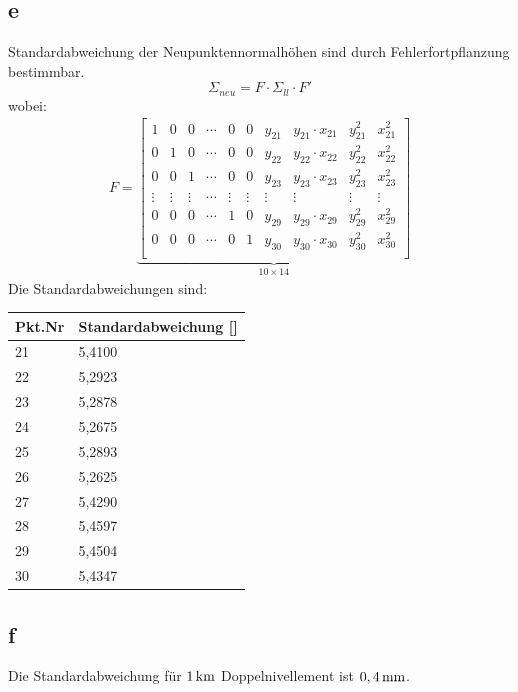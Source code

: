 \subsection{e}
Standardabweichung der Neupunktennormalhöhen sind durch Fehlerfortpflanzung bestimmbar. 
\begin{equation*}
	\Sigma_{neu} = F \cdot \Sigma_{ll} \cdot F'
\end{equation*} 
wobei:
\begin{gather*}
	F = \underbrace{\begin{bmatrix}
	1 & 0 & 0 & \cdots & 0 & 0 & y_{21} & y_{21} \cdot x_{21} & y_{21}^2 & x_{21}^2 \\
	0 & 1 & 0 & \cdots & 0 & 0 & y_{22} & y_{22} \cdot x_{22} & y_{22}^2 & x_{22}^2 \\
	0 & 0 & 1 & \cdots & 0 & 0 & y_{23} & y_{23} \cdot x_{23} & y_{23}^2 & x_{23}^2 \\
	\vdots & \vdots & \vdots & \cdots & \vdots & \vdots & \vdots & \vdots & \vdots & \vdots \\
	0 & 0 & 0 & \cdots & 1 & 0 & y_{29} & y_{29} \cdot x_{29} & y_{29}^2 & x_{29}^2 \\
	0 & 0 & 0 & \cdots & 0 & 1 & y_{30} & y_{30} \cdot x_{30} & y_{30}^2 & x_{30}^2 \\
	\end{bmatrix}}_{\text{$10 \times 14$}}
\end{gather*}
Die Standardabweichungen sind: 
\begin{table}[ht] \centering
	\begin{tabular}{|l|l|}
		\hline
		Pkt.Nr & Standardabweichung [\ut{mm}] \\ \hline
		21     & 5,4100       \\ \hline
		22     & 5,2923       \\ \hline
		23     & 5,2878       \\ \hline
		24     & 5,2675      \\ \hline
		25     & 5,2893    \\ \hline
		26     & 5,2625       \\ \hline
		27     & 5,4290       \\ \hline
		28     & 5,4597       \\ \hline
		29     & 5,4504       \\ \hline
		30     & 5,4347      \\ \hline
	\end{tabular}
\end{table}
\subsection{f}
Die Standardabweichung für $1 \,\mathrm{km}$ Doppelnivellement ist $0,4 \,\mathrm{mm}$.